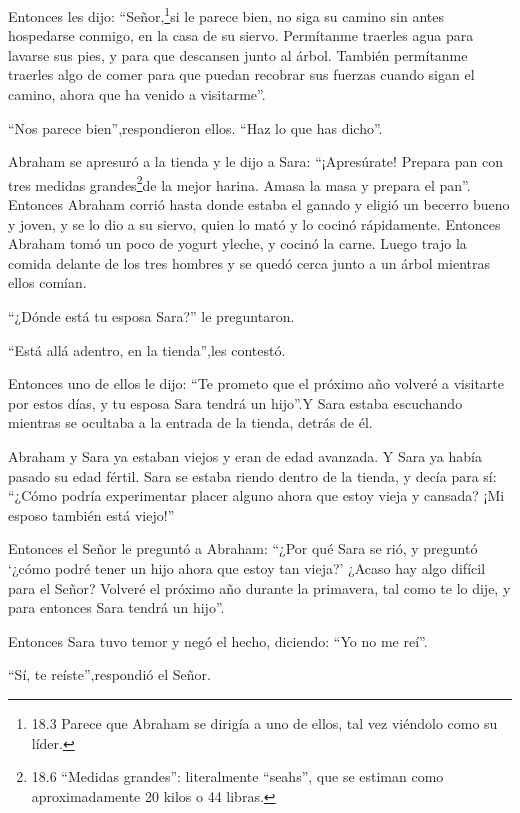  Entonces les dijo: ``Señor,\footnote{18.3 Parece que
  Abraham se dirigía a uno de ellos, tal vez viéndolo como su líder.}si
le parece bien, no siga su camino sin antes hospedarse conmigo, en la
casa de su siervo.  Permítanme traerles agua para lavarse
sus pies, y para que descansen junto al árbol.  También
permítanme traerles algo de comer para que puedan recobrar sus fuerzas
cuando sigan el camino, ahora que ha venido a visitarme''.

``Nos parece bien'',respondieron ellos. ``Haz lo que has dicho''.

 Abraham se apresuró a la tienda y le dijo a Sara:
``¡Apresúrate! Prepara pan con tres medidas grandes\footnote{18.6
  ``Medidas grandes'': literalmente ``seahs'', que se estiman como
  aproximadamente 20 kilos o 44 libras.}de la mejor harina. Amasa la
masa y prepara el pan''.  Entonces Abraham corrió hasta
donde estaba el ganado y eligió un becerro bueno y joven, y se lo dio a
su siervo, quien lo mató y lo cocinó rápidamente.  Entonces
Abraham tomó un poco de yogurt yleche, y cocinó la carne. Luego trajo la
comida delante de los tres hombres y se quedó cerca junto a un árbol
mientras ellos comían.

 ``¿Dónde está tu esposa Sara?'' le preguntaron.

``Está allá adentro, en la tienda'',les contestó.

 Entonces uno de ellos le dijo: ``Te prometo que el próximo
año volveré a visitarte por estos días, y tu esposa Sara tendrá un
hijo''.Y Sara estaba escuchando mientras se ocultaba a la entrada de la
tienda, detrás de él.

 Abraham y Sara ya estaban viejos y eran de edad avanzada.
Y Sara ya había pasado su edad fértil.  Sara se estaba
riendo dentro de la tienda, y decía para sí: ``¿Cómo podría experimentar
placer alguno ahora que estoy vieja y cansada? ¡Mi esposo también está
viejo!''

 Entonces el Señor le preguntó a Abraham: ``¿Por qué Sara
se rió, y preguntó `¿cómo podré tener un hijo ahora que estoy tan
vieja?'  ¿Acaso hay algo difícil para el Señor? Volveré el
próximo año durante la primavera, tal como te lo dije, y para entonces
Sara tendrá un hijo''.

 Entonces Sara tuvo temor y negó el hecho, diciendo: ``Yo
no me reí''.

``Sí, te reíste'',respondió el Señor.

